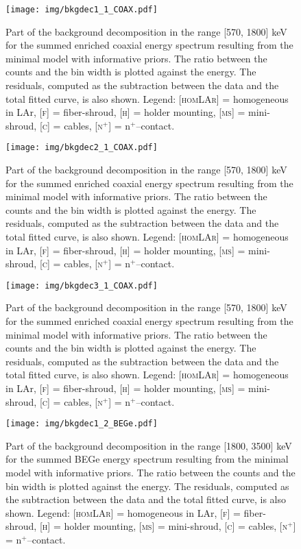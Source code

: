 \begin{landscape}
	\begin{figure}
		\centering
		\texttt{[image: img/bkgdec1\_1\_COAX.pdf]}
		\caption{Part of the background decomposition in the range [570, 1800] keV for the summed enriched coaxial energy spectrum resulting from the minimal model with informative priors. The ratio between the counts and the bin width is plotted against the energy. The residuals, computed as the subtraction between the data and the total fitted curve, is also shown. Legend: \textsc{[homLAr]} = homogeneous in LAr, \textsc{[f]} = fiber-shroud, \textsc{[h]} = holder mounting, \textsc{[ms]} = mini-shroud, \textsc{[c]} = cables, \textsc{[n$^+$]} = n$^+$--contact.}
	\end{figure}
	\begin{figure}
		\centering
		\texttt{[image: img/bkgdec2\_1\_COAX.pdf]}
		\caption{Part of the background decomposition in the range [570, 1800] keV for the summed enriched coaxial energy spectrum resulting from the minimal model with informative priors. The ratio between the counts and the bin width is plotted against the energy. The residuals, computed as the subtraction between the data and the total fitted curve, is also shown. Legend: \textsc{[homLAr]} = homogeneous in LAr, \textsc{[f]} = fiber-shroud, \textsc{[h]} = holder mounting, \textsc{[ms]} = mini-shroud, \textsc{[c]} = cables, \textsc{[n$^+$]} = n$^+$--contact.}
	\end{figure}
	\begin{figure}
		\centering
		\texttt{[image: img/bkgdec3\_1\_COAX.pdf]}
		\caption{Part of the background decomposition in the range [570, 1800] keV for the summed enriched coaxial energy spectrum resulting from the minimal model with informative priors. The ratio between the counts and the bin width is plotted against the energy. The residuals, computed as the subtraction between the data and the total fitted curve, is also shown. Legend: \textsc{[homLAr]} = homogeneous in LAr, \textsc{[f]} = fiber-shroud, \textsc{[h]} = holder mounting, \textsc{[ms]} = mini-shroud, \textsc{[c]} = cables, \textsc{[n$^+$]} = n$^+$--contact.}
	\end{figure}
	\begin{figure}
		\centering
		\texttt{[image: img/bkgdec1\_2\_BEGe.pdf]}
		\caption{Part of the background decomposition in the range [1800, 3500] keV for the summed BEGe energy spectrum resulting from the minimal model with informative priors. The ratio between the counts and the bin width is plotted against the energy. The residuals, computed as the subtraction between the data and the total fitted curve, is also shown. Legend: \textsc{[homLAr]} = homogeneous in LAr, \textsc{[f]} = fiber-shroud, \textsc{[h]} = holder mounting, \textsc{[ms]} = mini-shroud, \textsc{[c]} = cables, \textsc{[n$^+$]} = n$^+$--contact.}

\end{figure}
\end{landscape}
